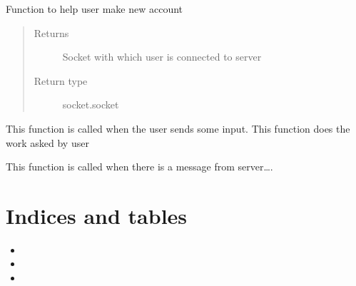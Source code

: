 \documentclass[letterpaper,10pt,english]{sphinxmanual}
\begin{document}
\begin{fulllineitems}
\label{\detokenize{app:app.signup}}
Function to help user make new account
\begin{quote}\begin{description}
\item[{Returns}] \leavevmode
Socket with which user is connected to server

\item[{Return type}] \leavevmode
socket.socket

\end{description}\end{quote}

\end{fulllineitems}


\begin{fulllineitems}
\label{\detokenize{app:app.handleUserInput}}
This function is called when the user sends some input. This function does the work asked by user

\end{fulllineitems}


\begin{fulllineitems}
\label{\detokenize{app:app.handleMessageFromServer}}
This function is called when there is a message from server….

\end{fulllineitems}



\chapter{Indices and tables}
\label{\detokenize{index:indices-and-tables}}\begin{itemize}
\item {} 

\item {} 

\item {} 

\end{itemize}
\end{document}
